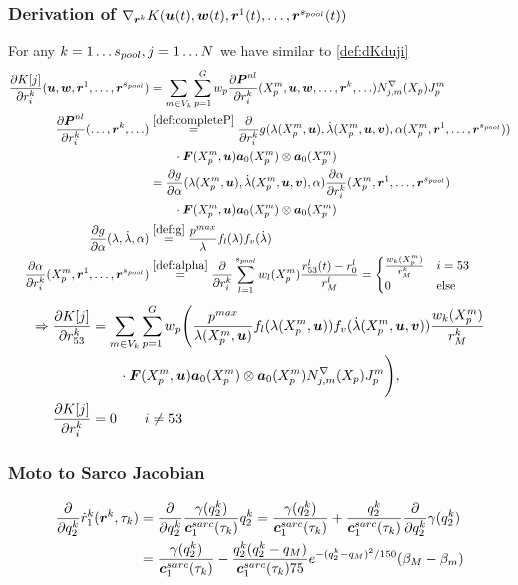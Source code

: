 \subsubsection{Derivation of $\nabla_{\boldsymbol{r}^k}K(\boldsymbol{u}(t),\boldsymbol{w}(t),\boldsymbol{r}^1(t),\ldots,\boldsymbol{r}^{s_{pool}}(t))$}
For any $k = 1\ldots{s_{pool}}, j=1\ldots N$ we have similar to \eqref{def:dKduji}
\begin{align}
	\d{K[j]}{r^k_i}(\vu,\vw,\vr^1,\ldots,\vr^\mups) &= \sumvk\sumgp w_p \d{\vPnl}{r^k_i}(\pmp,\vu,\vw,\ldots,\vr^k,\ldots) \dNjmp\jmp\\
	\d{\vPnl}{r^k_i}(\ldots,\vr^k,\ldots) & \re{def:completeP} \d{}{r^k_i} g(\la(\pmp,\vu),\dla(\pmp,\vu,\vv),\alpha(\pmp,\vr^1,\ldots,\vr^\mups))\nonumber\\
	&\qquad\cdot\vF(\pmp,\vu)\va_0(\pmp)\otimes\va_0(\pmp)\\
	&= \d{g}{\alpha}(\la(\pmp,\vu),\dla(\pmp,\vu,\vv),\alpha)\d{\alpha}{r^k_i}(\pmp,\vr^1,\ldots,\vr^\mups)\nonumber\\
	&\qquad\cdot\vF(\pmp,\vu)\va_0(\pmp)\otimes\va_0(\pmp)\\
	\d{g}{\alpha}(\la,\dla,\alpha) &\re{def:g} \frac{p^{max}}{\la}f_l(\la)f_v(\dla)\\
	\d{\alpha}{r^k_i}(\pmp,\vr^1,\ldots,\vr^\mups) &\re{def:alpha} \d{}{r^k_i}\sum\limits_{l=1}^\mups w_l(\pmp)\frac{r^l_{53}(t)-r^l_0}{r^l_M} = \begin{cases}
		\frac{w_k(\pmp)}{r^k_M} & i=53\\
		0 & \text{else}
	\end{cases}
\end{align}
\begin{align}	
	\Rightarrow\frac{\partial K[j]}{\partial r^k_{53}} &= \sum\limits_{m\in V_k}^{}\sum\limits_{p=1}^{G} w_p \Biggl(\frac{p^{max}}{\lambda(X^m_p,\boldsymbol{u})}f_l(\lambda(X^m_p,\boldsymbol{u}))f_v(\dot{\lambda}(X^m_p,\boldsymbol{u},\boldsymbol{v}))\frac{w_k(X^m_p)}{r^k_M}\nonumber\\
	&\qquad \cdot \boldsymbol{F}(X^m_p,\boldsymbol{u})\boldsymbol{a}_0(X^m_p)\otimes\boldsymbol{a}_0(X^m_p)N^\nabla_{j,m}(X_p)J^m_p\Biggr),\\
	\frac{\partial K[j]}{\partial r^k_i} &= 0 \qquad i \neq 53
\end{align}

\subsubsection{Moto to Sarco Jacobian}
\begin{align}
	\frac{\partial }{\partial q_2^k}\dot{r}_1^k(\boldsymbol{r}^k,\tau_k) &= \frac{\partial }{\partial q_2^k}\frac{\gamma(q_2^k)}{\boldsymbol{c}^{sarc}_1(\tau_k)}q_2^k = \frac{\gamma(q_2^k)}{\boldsymbol{c}^{sarc}_1(\tau_k)} + \frac{q_2^k}{\boldsymbol{c}^{sarc}_1(\tau_k)}\frac{\partial }{\partial q_2^k}\gamma(q_2^k)\\
	&=  \frac{\gamma(q_2^k)}{\boldsymbol{c}^{sarc}_1(\tau_k)} - \frac{q_2^k(q_2^k-q_M)}{\boldsymbol{c}^{sarc}_1(\tau_k)75}e^{-(q_2^k-q_M)^2/150}(\beta_M-\beta_m)
\end{align}

